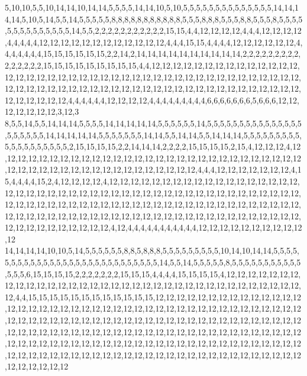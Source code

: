 5,10,10,5,5,10,14,14,10,14,14,5,5,5,5,14,14,10,5,10,5,5,5,5,5,5,5,5,5,5,5,5,5,5,14,14,14,14,5,10,5,14,5,5,14,5,5,5,5,5,8,8,8,8,8,8,8,8,8,8,8,5,5,5,8,8,8,5,5,5,8,8,5,5,5,8,5,5,5,5,5,5,5,5,5,5,5,5,5,5,14,5,5,2,2,2,2,2,2,2,2,2,2,2,15,15,4,4,12,12,12,12,4,4,4,12,12,12,12,4,4,4,4,4,12,12,12,12,12,12,12,12,12,12,12,12,4,4,4,15,15,4,4,4,4,12,12,12,12,12,12,4,4,4,4,4,4,4,15,15,15,15,15,15,2,2,14,2,14,14,14,14,14,14,14,14,14,14,2,2,2,2,2,2,2,2,2,2,2,2,2,2,2,15,15,15,15,15,15,15,15,15,4,4,12,12,12,12,12,12,12,12,12,12,12,12,12,12,12,12,12,12,12,12,12,12,12,12,12,12,12,12,12,12,12,12,12,12,12,12,12,12,12,12,12,12,12,12,12,12,12,12,12,12,12,12,12,12,12,12,12,12,12,12,12,12,12,12,12,12,12,12,12,12,12,12,12,12,12,12,4,4,4,4,4,4,12,12,12,12,4,4,4,4,4,4,4,4,4,6,6,6,6,6,6,6,5,6,6,6,12,12,12,12,12,12,12,3,12,3
8,5,5,14,5,5,14,14,14,5,5,5,5,14,14,14,14,14,5,5,5,5,5,5,14,5,5,5,5,5,5,5,5,5,5,5,5,5,5,5,5,5,5,5,5,5,14,14,14,14,14,5,5,5,5,5,5,5,14,14,5,5,14,14,5,5,14,14,14,5,5,5,5,5,5,5,5,5,5,5,5,5,5,5,5,5,5,5,2,15,15,15,15,2,2,14,14,14,2,2,2,2,15,15,15,15,2,15,4,12,12,12,4,12,12,12,12,12,12,12,12,12,12,12,12,12,12,12,12,12,12,12,12,12,12,12,12,12,12,12,12,12,12,12,12,12,12,12,12,12,12,12,12,12,12,12,12,12,12,12,4,4,4,12,12,12,12,12,12,12,4,15,4,4,4,4,15,2,4,12,12,12,12,4,12,12,12,12,12,12,12,12,12,12,12,12,12,12,12,12,12,12,12,12,12,12,12,12,12,12,12,12,12,12,12,12,12,12,12,12,12,12,12,12,12,12,12,12,12,12,12,12,12,12,12,12,12,12,12,12,12,12,12,12,12,12,12,12,12,12,12,12,12,12,12,12,12,12,12,12,12,12,12,12,12,12,12,12,12,12,12,12,12,12,12,12,12,12,12,12,12,12,12,12,12,12,12,12,12,12,12,12,12,12,12,12,4,12,4,4,4,4,4,4,4,4,4,4,4,12,12,12,12,12,12,12,12,12,12,12
14,14,14,14,10,10,5,14,5,5,5,5,5,5,8,8,5,8,8,8,5,5,5,5,5,5,5,5,5,10,14,10,14,14,5,5,5,5,5,5,5,5,5,5,5,5,5,5,5,5,5,5,5,5,5,5,5,5,5,5,5,5,14,5,5,14,5,5,5,5,5,8,5,5,5,5,5,5,5,5,5,5,5,5,5,5,6,15,15,15,15,2,2,2,2,2,2,2,15,15,15,4,4,4,4,15,15,15,15,4,12,12,12,12,12,12,12,12,12,12,12,12,12,12,12,12,12,12,12,12,12,12,12,12,12,12,12,12,12,12,12,12,12,12,12,12,4,4,15,15,15,15,15,15,15,15,15,15,15,15,12,12,12,12,12,12,12,12,12,12,12,12,12,12,12,12,12,12,12,12,12,12,12,12,12,12,12,12,12,12,12,12,12,12,12,12,12,12,12,12,12,12,12,12,12,12,12,12,12,12,12,12,12,12,12,12,12,12,12,12,12,12,12,12,12,12,12,12,12,12,12,12,12,12,12,12,12,12,12,12,12,12,12,12,12,12,12,12,12,12,12,12,12,12,12,12,12,12,12,12,12,12,12,12,12,12,12,12,12,12,12,12,12,12,12,12,12,12,12,12,12,12,12,12,12,12,12,12,12,12,12,12,12,12,12,12,12,12,12,12,12,12,12,12,12,12,12,12,12,12,12,12,12,12,12,12,12,12,12,12

